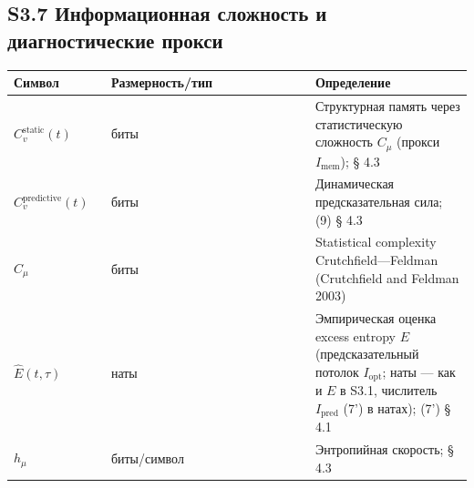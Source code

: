 \documentclass[pdflatex,sn-mathphys-ay]{sn-jnl}
\begin{document}
\subsection*{S3.7 Информационная сложность и диагностические прокси}\label{s3.7-ux438ux43dux444ux43eux440ux43cux430ux446ux438ux43eux43dux43dux430ux44f-ux441ux43bux43eux436ux43dux43eux441ux442ux44c-ux438-ux434ux438ux430ux433ux43dux43eux441ux442ux438ux447ux435ux441ux43aux438ux435-ux43fux440ux43eux43aux441ux438}



\begin{center}\small
\begin{tabular}{@{} >{\raggedright\arraybackslash}p{0.2105\linewidth} >{\raggedright\arraybackslash}p{0.4474\linewidth} >{\raggedright\arraybackslash}p{0.3421\linewidth}@{}}
\toprule

\begin{minipage}[b]{\linewidth}\raggedright

Символ

\end{minipage} & \begin{minipage}[b]{\linewidth}\raggedright

Размерность/тип

\end{minipage} & \begin{minipage}[b]{\linewidth}\raggedright

Определение

\end{minipage} \\

\midrule

\(C_v^{\text{static}}(t)\) & биты & Структурная память через статистическую сложность \(C_\mu\) (прокси \(I_{\text{mem}}\)); § 4.3 \\

\(C_v^{\text{predictive}}(t)\) & биты & Динамическая предсказательная сила; (9) § 4.3 \\

\(C_\mu\) & биты & Statistical complexity Crutchfield---Feldman (Crutchfield and Feldman 2003) \\

\(\hat E(t, \tau)\) & наты & Эмпирическая оценка excess entropy \(E\) (предсказательный потолок \(I_{\text{opt}}\); наты --- как и \(E\) в S3.1, числитель \(I_{\text{pred}}\) (7') в натах); (7') § 4.1 \\

\(h_\mu\) & биты/символ & Энтропийная скорость; § 4.3 \\

\bottomrule
\end{tabular}
\end{center}
\end{document}
